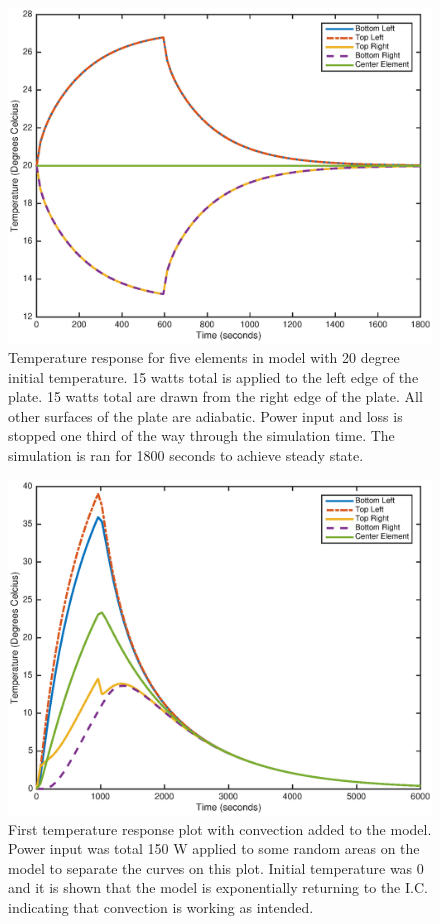 \documentclass[10pt,twocolumn]{article}
\begin{document}
\begin{figure}
	\center
	\includegraphics[width=0.8\linewidth]{TmpRspn25x25,15Wleftedge,-15Wrightedge,halftime.eps}
	\caption{Temperature response for five elements in model with 20 degree initial temperature. 15 watts total is applied to the left edge of the plate. 15 watts total are drawn from the right edge of the plate. All other surfaces of the plate are adiabatic. Power input and loss is stopped one third of the way through the simulation time. The simulation is ran for 1800 seconds to achieve steady state.}
	\label{fig:TmpRspn25x25,15Wleftedge,-15Wrightedge,halftime}
\end{figure}

\begin{figure}
	\center
	\includegraphics[width=0.8\linewidth]{TmpRspnConvectionOct29,it0,pi150.eps}
	\caption{First temperature response plot with convection added to the model. Power input was total 150 W applied to some random areas on the model to separate the curves on this plot. Initial temperature was 0 and it is shown that the model is exponentially returning to the I.C. indicating that convection is working as intended.}
	\label{fig:TmpRspnConvectionOct29,it0,pi150}
\end{figure}
\end{document}
